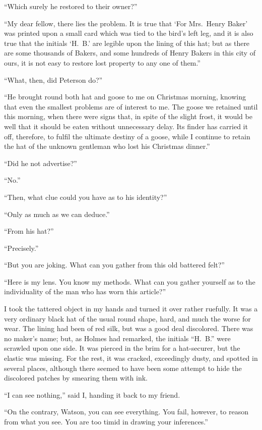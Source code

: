 “Which surely he restored to their owner?”

“My dear fellow, there lies the problem. It is true that
‘For Mrs.~Henry Baker’ was printed upon a small card which
was tied to the bird’s left leg, and it is also true that the
initials ‘H.\ B.’ are legible upon the lining of this hat; but as
there are some thousands of Bakers, and some hundreds of
Henry Bakers in this city of ours, it is not easy to restore lost
property to any one of them.”

“What, then, did Peterson do?”

“He brought round both hat and goose to me on Christmas
morning, knowing that even the smallest problems are of
interest to me. The goose we retained until this morning,
when there were signs that, in spite of the slight frost, it
would be well that it should be eaten without unnecessary
delay. Its finder has carried it off, therefore, to fulfil the
ultimate destiny of a goose, while I continue to retain
the hat of the unknown gentleman who lost his Christmas
dinner.”

“Did he not advertise?”

“No.”

“Then, what clue could you have as to his identity?”

“Only as much as we can deduce.”

“From his hat?”

“Precisely.”

“But you are joking. What can you gather from this old
battered felt?”

“Here is my lens. You know my methods. What can you
gather yourself as to the individuality of the man who has worn
this article?”

I took the tattered object in my hands and turned it over
rather ruefully. It was a very ordinary black hat of the usual
round shape, hard, and much the worse for wear. The lining
had been of red silk, but was a good deal discolored. There
was no maker’s name; but, as Holmes had remarked, the
initials “H.\ B.” were scrawled upon one side. It was pierced
in the brim for a hat-securer, but the elastic was missing.
For the rest, it was cracked, exceedingly dusty, and spotted
in several places, although there seemed to have been some
attempt to hide the discolored patches by smearing them with
ink.

“I can see nothing,” said I, handing it back to my friend.

“On the contrary, Watson, you can see everything. You
fail, however, to reason from what you see. You are too timid
in drawing your inferences.”

